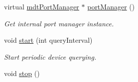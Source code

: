 \begin{DoxyCompactItemize}
virtual \hyperlink{classmdt_port_manager}{mdtPortManager} $\ast$ \hyperlink{classmdt_device_a06d9178b4133fd7b23084e712af20976}{portManager} ()
\begin{DoxyCompactList}\small\item\em Get internal port manager instance. \end{DoxyCompactList}\item 
void \hyperlink{classmdt_device_a721c5bf2cfa0eef5304333f08da182f7}{start} (int queryInterval)
\begin{DoxyCompactList}\small\item\em Start periodic device querying. \end{DoxyCompactList}\item 
\hypertarget{classmdt_device_adc7ff8f01d68506283a3d0cc6bc25407}{
void \hyperlink{classmdt_device_adc7ff8f01d68506283a3d0cc6bc25407}{stop} ()}
\label{classmdt_device_adc7ff8f01d68506283a3d0cc6bc25407}


\end{DoxyCompactItemize}
